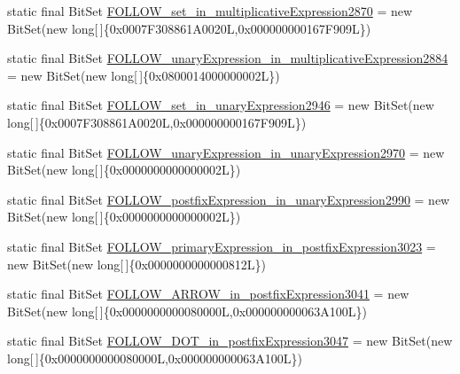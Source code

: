 \begin{DoxyCompactItemize}
\item 
static final Bit\-Set \hyperlink{classorg_1_1tzi_1_1use_1_1parser_1_1soil_1_1_soil_parser_a969c9f888ebdf3f9803d50ee3d700448}{F\-O\-L\-L\-O\-W\-\_\-set\-\_\-in\-\_\-multiplicative\-Expression2870} = new Bit\-Set(new long\mbox{[}$\,$\mbox{]}\{0x0007\-F308861\-A0020\-L,0x000000000167\-F909\-L\})
\item 
static final Bit\-Set \hyperlink{classorg_1_1tzi_1_1use_1_1parser_1_1soil_1_1_soil_parser_a2419ea298b886b38d111c2911859d59a}{F\-O\-L\-L\-O\-W\-\_\-unary\-Expression\-\_\-in\-\_\-multiplicative\-Expression2884} = new Bit\-Set(new long\mbox{[}$\,$\mbox{]}\{0x0800014000000002\-L\})
\item 
static final Bit\-Set \hyperlink{classorg_1_1tzi_1_1use_1_1parser_1_1soil_1_1_soil_parser_a98abb7f2d86607913215e7c51afa61ce}{F\-O\-L\-L\-O\-W\-\_\-set\-\_\-in\-\_\-unary\-Expression2946} = new Bit\-Set(new long\mbox{[}$\,$\mbox{]}\{0x0007\-F308861\-A0020\-L,0x000000000167\-F909\-L\})
\item 
static final Bit\-Set \hyperlink{classorg_1_1tzi_1_1use_1_1parser_1_1soil_1_1_soil_parser_a5b2e7c4cac913dc0875a31e86ea063b9}{F\-O\-L\-L\-O\-W\-\_\-unary\-Expression\-\_\-in\-\_\-unary\-Expression2970} = new Bit\-Set(new long\mbox{[}$\,$\mbox{]}\{0x0000000000000002\-L\})
\item 
static final Bit\-Set \hyperlink{classorg_1_1tzi_1_1use_1_1parser_1_1soil_1_1_soil_parser_aea5ffd83a1e4f9ceb6fcf6235c97f48d}{F\-O\-L\-L\-O\-W\-\_\-postfix\-Expression\-\_\-in\-\_\-unary\-Expression2990} = new Bit\-Set(new long\mbox{[}$\,$\mbox{]}\{0x0000000000000002\-L\})
\item 
static final Bit\-Set \hyperlink{classorg_1_1tzi_1_1use_1_1parser_1_1soil_1_1_soil_parser_a811cdfc4e6e5bb07b5684c709bd96405}{F\-O\-L\-L\-O\-W\-\_\-primary\-Expression\-\_\-in\-\_\-postfix\-Expression3023} = new Bit\-Set(new long\mbox{[}$\,$\mbox{]}\{0x0000000000000812\-L\})
\item 
static final Bit\-Set \hyperlink{classorg_1_1tzi_1_1use_1_1parser_1_1soil_1_1_soil_parser_a45e46222765edece3ee666930c922cb3}{F\-O\-L\-L\-O\-W\-\_\-\-A\-R\-R\-O\-W\-\_\-in\-\_\-postfix\-Expression3041} = new Bit\-Set(new long\mbox{[}$\,$\mbox{]}\{0x0000000000080000\-L,0x000000000063\-A100\-L\})
\item 
static final Bit\-Set \hyperlink{classorg_1_1tzi_1_1use_1_1parser_1_1soil_1_1_soil_parser_a8babbdfeecaef844b0cf51481c2a36c0}{F\-O\-L\-L\-O\-W\-\_\-\-D\-O\-T\-\_\-in\-\_\-postfix\-Expression3047} = new Bit\-Set(new long\mbox{[}$\,$\mbox{]}\{0x0000000000080000\-L,0x000000000063\-A100\-L\})

\end{DoxyCompactItemize}
